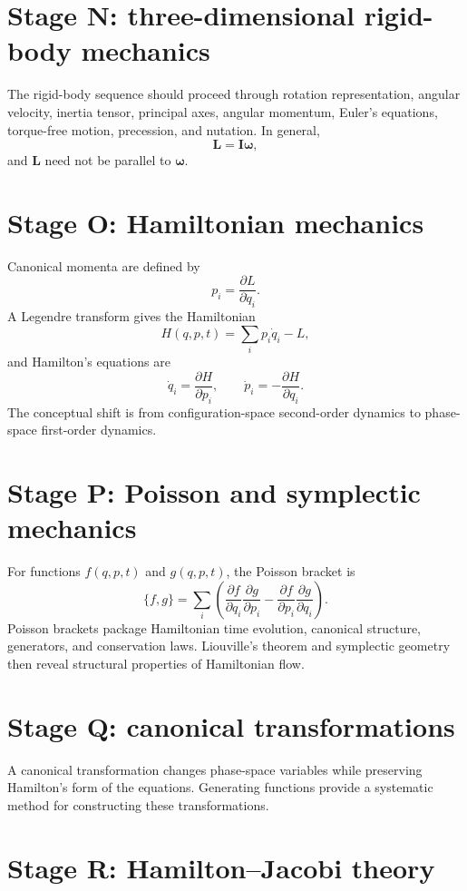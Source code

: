 \section{Stage N: three-dimensional rigid-body mechanics}

The rigid-body sequence should proceed through rotation representation, angular velocity, inertia
tensor, principal axes, angular momentum, Euler's equations, torque-free motion, precession, and
nutation.  In general,
\[
\mathbf L=\mathbf I\boldsymbol\omega,
\]
and $\mathbf L$ need not be parallel to $\boldsymbol\omega$.

\section{Stage O: Hamiltonian mechanics}

Canonical momenta are defined by
\[
p_i=\frac{\partial L}{\partial\dot q_i}.
\]
A Legendre transform gives the Hamiltonian
\[
H(q,p,t)=\sum_i p_i\dot q_i-L,
\]
and Hamilton's equations are
\[
\dot q_i=\frac{\partial H}{\partial p_i},
\qquad
\dot p_i=-\frac{\partial H}{\partial q_i}.
\]
The conceptual shift is from configuration-space second-order dynamics to phase-space first-order
dynamics.

\section{Stage P: Poisson and symplectic mechanics}

For functions $f(q,p,t)$ and $g(q,p,t)$, the Poisson bracket is
\[
\{f,g\}=\sum_i
\left(
\frac{\partial f}{\partial q_i}\frac{\partial g}{\partial p_i}
-
\frac{\partial f}{\partial p_i}\frac{\partial g}{\partial q_i}
\right).
\]
Poisson brackets package Hamiltonian time evolution, canonical structure, generators, and
conservation laws.  Liouville's theorem and symplectic geometry then reveal structural properties of
Hamiltonian flow.

\section{Stage Q: canonical transformations}

A canonical transformation changes phase-space variables while preserving Hamilton's form of the
equations.  Generating functions provide a systematic method for constructing these transformations.

\section{Stage R: Hamilton--Jacobi theory}

